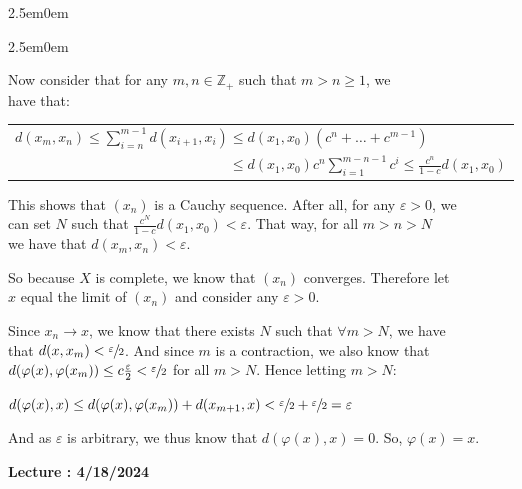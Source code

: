 \documentclass{book}
\newenvironment{myIndent}{%
   \begin{adjustwidth}{2.5em}{0em}%
}{%
   \end{adjustwidth}%
}
\newcommand{\retTwo}{\hfill\bigbreak}
\newcounter{LectureNumber}
\newcommand*{\markLecture}[1]{%
   \stepcounter{LectureNumber}%
   {\huge \color{Black} \textbf{Lecture \theLectureNumber: #1} \newline}%
}
\begin{document}
{\begin{myIndent}
{\begin{myIndent}
      Now consider that for any $m, n \in \mathbb{Z}_+$ such that $m > n \geq 1$, we\\ have that:
      
      \begin{center}
         \begin{tabular}{l}
            $d(x_m, x_n) \leq \sum\limits_{i=n}^{m-1}d(x_{i+1}, x_{i}) \leq d(x_1, x_0)(c^n + \ldots + c^{m-1})$\\

            $\phantom{d(x_m, x_n) \leq \sum\limits_{i=n}^{m-1}d(x_{i+1}, x_{i})} \leq d(x_1, x_0)c^n{\displaystyle\sum\limits_{i=1}^{m-n-1}}c^i \leq \frac{c^n}{1-c}d(x_1, x_0)$\\
         \end{tabular}\retTwo
      \end{center}

      This shows that $(x_n)$ is a Cauchy sequence. After all, for any $\varepsilon > 0$, we\\ can set $N$ such that $\frac{c^N}{1 - c}d(x_1, x_0) < \varepsilon$. That way, for all $m > n > N$\\ we have that $d(x_m, x_n) < \varepsilon$.\retTwo
      
      So because $X$ is complete, we know that $(x_n)$ converges. Therefore let\\ $x$ equal the limit of $(x_n)$ and consider any $\varepsilon > 0$.\retTwo
      
      Since $x_n \rightarrow x$, we know that there exists $N$ such that $\forall m > N$, we have\\ that $d(x, x_m) < \sfrac{\varepsilon}{2}$. And since $m$ is a contraction, we also know that\\ $d(\varphi(x), \varphi(x_m)) \leq c\frac{\varepsilon}{2} < \sfrac{\varepsilon}{2}$ for all $m > N$. Hence letting $m > N$:
      
      {\center $d(\varphi(x), x) \leq d(\varphi(x), \varphi(x_{m})) + d(x_{m+1}, x) < \sfrac{\varepsilon}{2} + \sfrac{\varepsilon}{2} = \varepsilon$ \retTwo\par}

      And as $\varepsilon$ is arbitrary, we thus know that $d(\varphi(x), x) = 0$. So, $\varphi(x) = x$.
   \end{myIndent}}
\end{myIndent}}

\newpage

\markLecture{4/18/2024}
\end{document}
